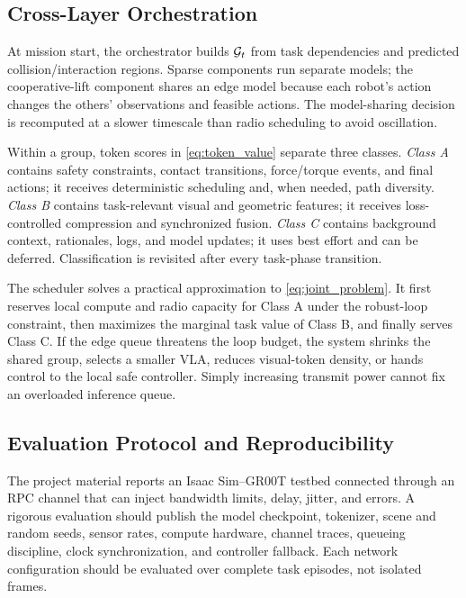 \documentclass[letterpaper,journal]{IEEEtran}
\begin{document}
\subsection{Cross-Layer Orchestration}
At mission start, the orchestrator builds ${\cal G}_t$ from task dependencies
and predicted collision/interaction regions. Sparse components run separate
models; the cooperative-lift component shares an edge model because each
robot's action changes the others' observations and feasible actions. The
model-sharing decision is recomputed at a slower timescale than radio
scheduling to avoid oscillation.

Within a group, token scores in \eqref{eq:token_value} separate three classes.
\emph{Class A} contains safety constraints, contact transitions, force/torque
events, and final actions; it receives deterministic scheduling and, when
needed, path diversity. \emph{Class B} contains task-relevant visual and
geometric features; it receives loss-controlled compression and synchronized
fusion. \emph{Class C} contains background context, rationales, logs, and
model updates; it uses best effort and can be deferred. Classification is
revisited after every task-phase transition.

The scheduler solves a practical approximation to
\eqref{eq:joint_problem}. It first reserves local compute and radio capacity
for Class A under the robust-loop constraint, then maximizes the marginal
task value of Class B, and finally serves Class C. If the edge queue threatens
the loop budget, the system shrinks the shared group, selects a smaller VLA,
reduces visual-token density, or hands control to the local safe controller.
Simply increasing transmit power cannot fix an overloaded inference queue.

\subsection{Evaluation Protocol and Reproducibility}
The project material reports an Isaac Sim--GR00T testbed connected through an
RPC channel that can inject bandwidth limits, delay, jitter, and errors. A
rigorous evaluation should publish the model checkpoint, tokenizer, scene and
random seeds, sensor rates, compute hardware, channel traces, queueing
discipline, clock synchronization, and controller fallback. Each network
configuration should be evaluated over complete task episodes, not isolated
frames.
\end{document}
